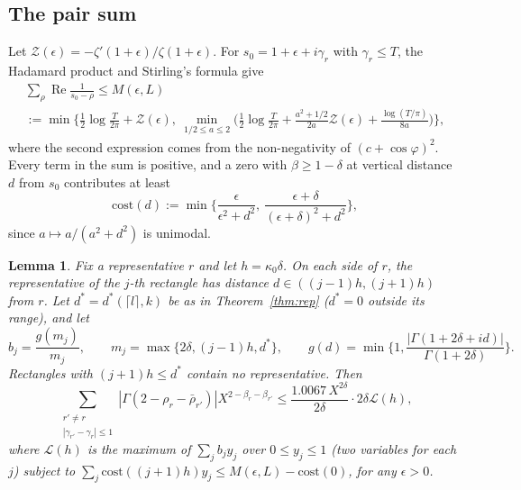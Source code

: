 \documentclass[11pt]{amsart}
\numberwithin{equation}{section}
\newtheorem{lemma}[theorem]{Lemma}
\theoremstyle{definition}
\theoremstyle{remark}
\newcommand{\Rp}{\operatorname{Re}}
\begin{document}
\subsection{The pair sum}

Let $\mathcal Z(\epsilon) = -\zeta'(1 + \epsilon)/\zeta(1 + \epsilon)$.
For $s_0 = 1 + \epsilon + i\gamma_r$ with $\gamma_r \leq T$, the Hadamard product and Stirling's formula give
\begin{multline}\label{eq:Mbudget}
\sum_\rho\Rp\frac{1}{s_0 - \rho} \leq M(\epsilon, L)\\
:= \min\Big\{\frac12\log\frac T{2\pi} + \mathcal Z(\epsilon),\ \min_{1/2\leq a\leq2}\Big(\frac12\log\frac T{2\pi} + \frac{a^2 + 1/2}{2a}\mathcal Z(\epsilon) + \frac{\log(T/\pi)}{8a}\Big)\Big\},
\end{multline}
where the second expression comes from the non-negativity of $(c + \cos\varphi)^2$.
Every term in the sum is positive, and a zero with $\beta \geq 1 - \delta$ at vertical distance $d$ from $s_0$ contributes at least
\begin{equation}\label{eq:cost}
\mathrm{cost}(d) := \min\Big\{\frac{\epsilon}{\epsilon^2 + d^2},\ \frac{\epsilon + \delta}{(\epsilon + \delta)^2 + d^2}\Big\},
\end{equation}
since $a \mapsto a/(a^2 + d^2)$ is unimodal.

\begin{lemma}\label{lem:pair}
Fix a representative $r$ and let $h = \kappa_0\delta$.
On each side of $r$, the representative of the $j$-th rectangle has distance $d \in ((j-1)h, (j+1)h)$ from $r$.
Let $d^* = d^*(\lceil l\rceil, k)$ be as in Theorem~\ref{thm:rep} ($d^* = 0$ outside its range), and let
\[
b_j = \frac{g(m_j)}{m_j}, \qquad m_j = \max\{2\delta, (j-1)h, d^*\}, \qquad g(d) = \min\Big\{1, \frac{|\Gamma(1 + 2\delta + id)|}{\Gamma(1 + 2\delta)}\Big\}.
\]
Rectangles with $(j+1)h \leq d^*$ contain no representative.
Then
\[
\sum_{\substack{r'\neq r\\ |\gamma_{r'} - \gamma_r|\leq1}}|\Gamma(2 - \rho_r - \bar\rho_{r'})|X^{2-\beta_r-\beta_{r'}} \leq \frac{1.0067\,X^{2\delta}}{2\delta}\cdot2\delta\mathcal L(h),
\]
where $\mathcal L(h)$ is the maximum of $\sum_jb_jy_j$ over $0 \leq y_j \leq 1$ (two variables for each $j$) subject to $\sum_j\mathrm{cost}((j+1)h)y_j \leq M(\epsilon, L) - \mathrm{cost}(0)$, for any $\epsilon > 0$.
\end{lemma}
\end{document}
